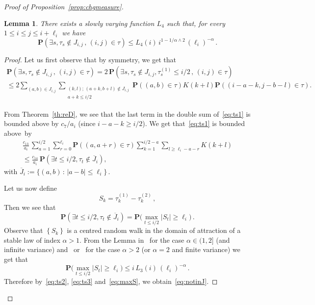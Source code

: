 \documentclass[10pt]{amsart}
\newtheorem{lemm}[theo]{Lemma}\newtheorem{prop}[theo]{Proposition}\newtheorem{coro}[theo]{Corollary}\newtheorem{conj}[theo]{Conjecture}
\theoremstyle{definition}\newtheorem{defi}[theo]{Definition}\newtheorem{rema}[theo]{Remark}\newtheorem{exam}[theo]{Example}\newtheorem{exem}[theo]{Example}\newtheorem{nota}[theo]{Notation}
\newcommand{\ga}{\alpha}
\newcommand{\bP}{\ensuremath{\mathbf{P}}}
\newcommand{\sumtwo}[2]{\sum_{\substack{#1 \\ #2}}}
\let\oldexists\exists
\renewcommand*{\exists}{\mathrel{\oldexists}}
\begin{document}
\begin{proof}[Proof of Proposition~\ref{prop:chgmeasure}]
\begin{lemm}\label{lem:notinJ}
There exists a slowly varying function $L_{4}$ such that, for every $1\leq i\leq j\leq i+\ell_i$ we have
\begin{equation}\label{eq:notinJ}
\bP\left(\exists s, \tau_s \notin J_{i,j}\,,\,(i,j)\in\tau\right) \leq L_{4}(i)\,i^{1-1/\ga \wedge 2}\,(\ell_i)^{- \ga}\,.
\end{equation}
\end{lemm}

\begin{proof}
Let us first observe that by symmetry, we get that
\begin{multline}\label{eq:ts1}
\bP\left(\exists s, \tau_s \notin J_{i,j}\,,\,(i,j)\in\tau\right) = 2\,\bP\left(\exists s, \tau_s \notin J_{i,j}, \tau_s^{(1)}\leq i/2\,,\,(i,j)\in\tau \right)
\\
\leq 2 \sum_{(a,b) \in J_{i,j}} \sumtwo{(k,l);\,(a+k,b+l) \notin J_{i,j}}{a+k\leq i/2} \bP((a,b) \in \tau) K(k+l) \bP \left((i-a-k, j-b-l) \in \tau \right).
\end{multline}

From Theorem~\ref{th:reD}, we see that the last term in the double sum of~\eqref{eq:ts1} is bounded above by $c_7/a_i$ (since $i-a-k \geq i/2$). We get that~\eqref{eq:ts1} is bounded above~by
\begin{multline}\label{eq:ts2}
\frac{c_{13}}{a_i}\,\sum_{a=1}^{i/2} \sum_{r=0}^{\ell_i} \bP \left((a,a+r) \in \tau \right) \sum_{k = 1}^{i/2 - a}
\sum_{l \ge \ell_i - a-r} K(k+l)\\ 
\le \frac{c_{14}}{a_i}\,\bP\left(\exists t \le i/2, \tau_t \notin \overline{J}_{i} \right),
\end{multline}
with $\overline{J}_{i} := \big\{(a,b)\,:\,|a-b| \leq \ell_i \big\}\,.$

Let us now define
\begin{equation}
S_k = \tau_k^{(1)} - \tau_k^{(2)}\,,
\end{equation}
Then we see that
\begin{equation}\label{eq:ts3}
\bP\left(\exists t \le i/2, \tau_t \notin \overline{J}_{i} \right) =
\bP \Big(\max_{t \le i/2} \vert S_t \vert \ge \ell_i \Big)\,.
\end{equation}
Observe that $\left\lbrace S_k \right\rbrace$ is a centred random walk in the domain of attraction of a stable law of index $\ga >1$. From the Lemma in~\cite{cf:SW11} for the case $\ga \in (1,2]$ (and infinite variance) and~\cite[Corollary~1]{cf:Pi81} or~\cite[Equation (12)]{cf:BB00} for the case $\ga >2$ (or $\ga=2$ and finite variance) we get that
\begin{equation}\label{eq:maxS}
\bP \Big(\max_{t \le i/2} \vert S_t \vert \ge \ell_i \Big) \le i\,L_{3}(i)\,(\ell_i)^{- \ga}\,.
\end{equation}
Therefore by~\eqref{eq:ts2}, \eqref{eq:ts3} and~\eqref{eq:maxS}, we obtain~\eqref{eq:notinJ}.
\end{proof}


\end{proof}
\end{document}
